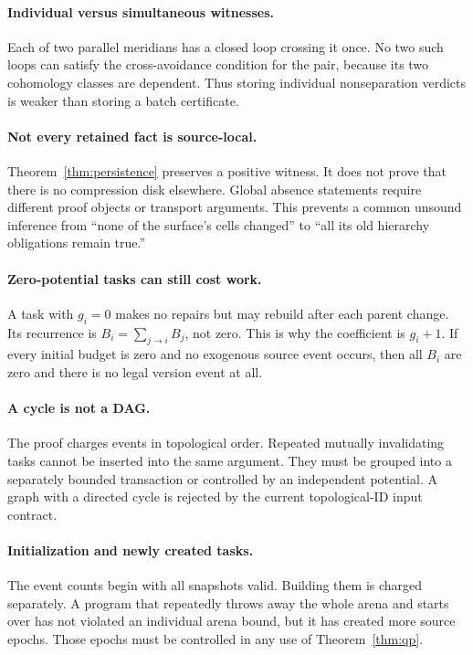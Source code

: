 \documentclass[11pt]{article}
\theoremstyle{definition}
\begin{document}
\paragraph{Individual versus simultaneous witnesses.}
Each of two parallel meridians has a closed loop crossing it once. No two such loops can satisfy the cross-avoidance condition for the pair, because its two cohomology classes are dependent. Thus storing individual nonseparation verdicts is weaker than storing a batch certificate.

\paragraph{Not every retained fact is source-local.}
Theorem~\ref{thm:persistence} preserves a positive witness. It does not prove that there is no compression disk elsewhere. Global absence statements require different proof objects or transport arguments. This prevents a common unsound inference from ``none of the surface's cells changed'' to ``all its old hierarchy obligations remain true.''

\paragraph{Zero-potential tasks can still cost work.}
A task with $g_i=0$ makes no repairs but may rebuild after each parent change. Its recurrence is $B_i=\sum_{j\to i}B_j$, not zero. This is why the coefficient is $g_i+1$. If every initial budget is zero and no exogenous source event occurs, then all $B_i$ are zero and there is no legal version event at all.

\paragraph{A cycle is not a DAG.}
The proof charges events in topological order. Repeated mutually invalidating tasks cannot be inserted into the same argument. They must be grouped into a separately bounded transaction or controlled by an independent potential. A graph with a directed cycle is rejected by the current topological-ID input contract.

\paragraph{Initialization and newly created tasks.}
The event counts begin with all snapshots valid. Building them is charged separately. A program that repeatedly throws away the whole arena and starts over has not violated an individual arena bound, but it has created more source epochs. Those epochs must be controlled in any use of Theorem~\ref{thm:qp}.
\end{document}
